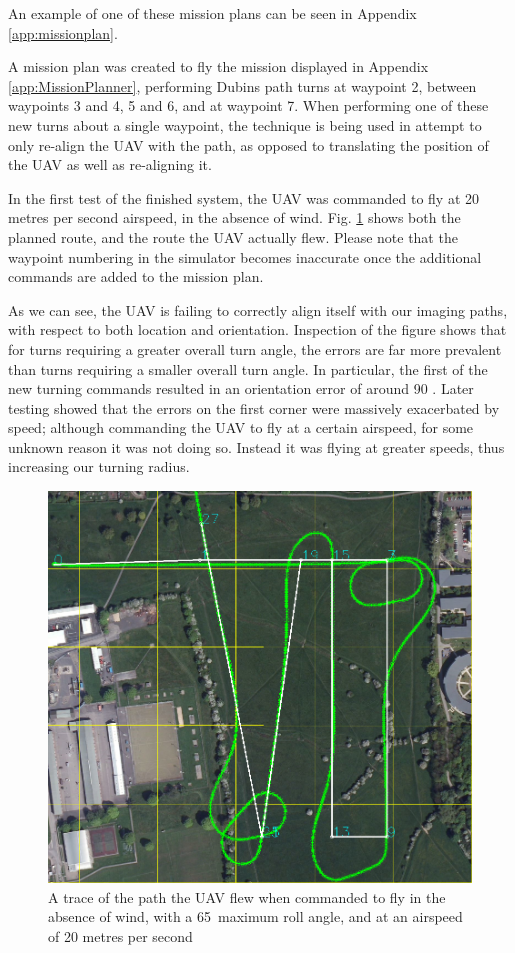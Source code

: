 An example of one of these mission plans can be seen in Appendix \ref{app:missionplan}.

A mission plan was created to fly the mission displayed in Appendix \ref{app:MissionPlanner}, performing Dubins path turns at waypoint 2, between waypoints 3 and 4, 5 and 6, and at waypoint 7. When performing one of these new turns about a single waypoint, the technique is being used in attempt to only re-align the UAV with the path, as opposed to translating the position of the UAV as well as re-aligning it. 

In the first test of the finished system, the UAV was commanded to fly at 20 metres per second airspeed, in the absence of wind. Fig. \ref{fig:6520nowind} shows both the planned route, and the route the UAV actually flew. Please note that the waypoint numbering in the simulator becomes inaccurate once the additional commands are added to the mission plan. 

As we can see, the UAV is failing to correctly align itself with our imaging paths, with respect to both location and orientation. Inspection of the figure shows that for turns requiring a greater overall turn angle, the errors are far more prevalent than turns requiring a smaller overall turn angle. In particular, the first of the new turning commands resulted in an orientation error of around 90 \degree. Later testing showed that the errors on the first corner were massively exacerbated by speed; although commanding the UAV to fly at a certain airspeed, for some unknown reason it was not doing so. Instead it was flying at greater speeds, thus increasing our turning radius.

\begin{figure}[htbp!] 
\centering    
\includegraphics[width=\textwidth]{65_20_NoWind}
\caption[Flying Dubins path turns in the absence of wind]{A trace of the path the UAV flew when commanded to fly in the absence of wind, with a 65\degree\  maximum roll angle, and at an airspeed of 20 metres per second}
\label{fig:6520nowind}
\end{figure} 

